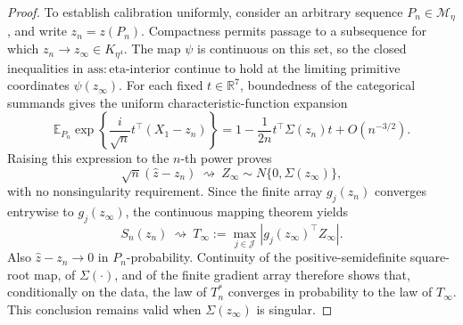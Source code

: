 \documentclass{article}
\begin{document}
\begin{proof}
To establish calibration uniformly, consider an arbitrary sequence \(P_n\in\mathcal M_\eta\), and write \(z_n=z(P_n)\).  Compactness permits passage to a subsequence for which \(z_n\to z_\infty\in K_{\eta^4}\).  The map \(\psi\) is continuous on this set, so the closed inequalities in \(\mathrm{ass{:}eta\text{-}interior}\) continue to hold at the limiting primitive coordinates \(\psi(z_\infty)\).  For each fixed \(t\in\mathbb R^7\), boundedness of the categorical summands gives the uniform characteristic-function expansion
\[
 \mathbb E_{P_n}\exp\!\left\{
 \frac{i}{\sqrt n}t^\top(X_1-z_n)
 \right\}
 =1-\frac1{2n}t^\top\Sigma(z_n)t+O(n^{-3/2}).
\]
Raising this expression to the \(n\)-th power proves
\[
 \sqrt n(\widehat z-z_n)\ \rightsquigarrow\
 Z_\infty\sim N\{0,\Sigma(z_\infty)\},
\]
with no nonsingularity requirement.  Since the finite array \(g_j(z_n)\) converges entrywise to \(g_j(z_\infty)\), the continuous mapping theorem yields
\[
 S_n(z_n)\ \rightsquigarrow\
 T_\infty:=\max_{j\in\mathcal J}
 \left|g_j(z_\infty)^\top Z_\infty\right|.
\]
Also \(\widehat z-z_n\to0\) in \(P_n\)-probability.  Continuity of the positive-semidefinite square-root map, of \(\Sigma(\cdot)\), and of the finite gradient array therefore shows that, conditionally on the data, the law of \(T_n^*\) converges in probability to the law of \(T_\infty\).  This conclusion remains valid when \(\Sigma(z_\infty)\) is singular.


\end{proof}
\end{document}
